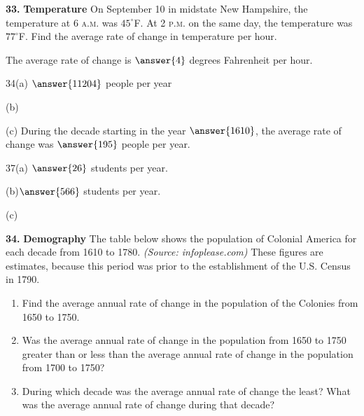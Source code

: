 \documentclass{ximera}
\begin{document}
\begin{problem}
\textbf{33.} \textbf{Temperature} On September 10 in midstate New Hampshire, the temperature at
  6 \textsc{a.m.} was $45^\circ$F. At 2 \textsc{p.m.} on the same day, the temperature was
  $77^\circ$F. Find the average rate of change in temperature per hour.

The average rate of change is $\answer{4}$ degrees Fahrenheit per hour.

34(a) $\answer{11204}$ people per year

(b) \begin{multipleChoice}
\end{multipleChoice}

(c) During the decade starting in the year $\answer{1610}$, the average rate of change was $\answer{195}$ people per year. 

37(a) $\answer{26}$ students per year.

(b)$\answer{566}$ students per year.

(c) \begin{multipleChoice}
\end{multipleChoice}
\end{problem}

\begin{problem}
\textbf{34.} \textbf{Demography} The table below shows the population of Colonial America for
  each decade from 1610 to 1780. \emph{(Source: infoplease.com)} These figures are
  estimates, because this period was prior to the establishment of the U.S. Census in 1790.
  \begin{enumerate}[label=\textbf{\alph*.},leftmargin=2em,topsep=2pt,itemsep=1pt]
    \item Find the average annual rate of change in the population of the Colonies from
          1650 to 1750.
    \item Was the average annual rate of change in the population from 1650 to 1750
          greater than or less than the average annual rate of change in the population
          from 1700 to 1750?
    \item During which decade was the average annual rate of change the least? What was
          the average annual rate of change during that decade?
  \end{enumerate}
\end{problem}
\end{document}
